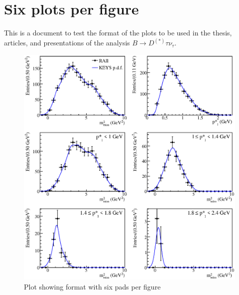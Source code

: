 \documentclass[12pt,twoside]{report}
\begin{document}
\newpage
\section{Six plots per figure}
This is a document to test the format of the plots to be used in the thesis, articles,
and presentations of the analysis $B\to D^{(*)}\tau\nu_{\tau}$. 

\begin{figure}[h]
\begin{center}\includegraphics[width=6.2in]{RAllepsKeys_01_Fit.eps}\end{center}
\vspace{-0.2in}
\caption{Plot showing format with six pads per figure}
\end{figure}
\end{document}
